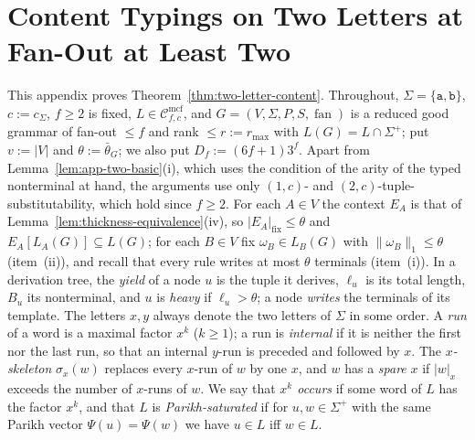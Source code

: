 \documentclass[11pt]{article}
\numberwithin{equation}{section}
\theoremstyle{plain}
\theoremstyle{definition}
\theoremstyle{remark}
\newcommand{\Cmcf}[2]{\mathcal{C}^{\mathrm{mcf}}_{#1,#2}}
\newcommand{\fan}{\operatorname{fan}}
\theoremstyle{plain}
\begin{document}
\section{Content Typings on Two Letters at Fan-Out at Least Two}
\label{app:two-letter-content}

This appendix proves Theorem~\ref{thm:two-letter-content}.  Throughout,
$\Sigma=\{\mathtt a,\mathtt b\}$, $c:=c_\Sigma$, $f\ge2$ is fixed, $L\in\Cmcf{f}{c}$, and
$G=(V,\Sigma,P,S,\fan)$ is a reduced good grammar of fan-out $\le f$ and rank
$\le r:=r_{\max}$ with $L(G)=L\cap\Sigma^+$; put $v:=|V|$ and
$\theta:=\bar\theta_G$; we also put $D_f:=(6f+1)3^f$.  Apart from Lemma~\ref{lem:app-two-basic}(i), which uses the
condition of the arity of the typed nonterminal at hand, the arguments use only
$(1,c)$- and $(2,c)$-tuple-substitutability, which hold since $f\ge2$.  For each $A\in V$ the context $E_A$ is that of
Lemma~\ref{lem:thickness-equivalence}(iv), so $|E_A|_{\mathrm{fix}}\le\theta$
and $E_A[L_A(G)]\subseteq L(G)$; for each $B\in V$ fix $\omega_B\in L_B(G)$ with
$\|\omega_B\|_1\le\theta$ (item~(ii)), and recall that every rule writes at most
$\theta$ terminals (item~(i)).  In a derivation tree, the \emph{yield} of a node
$u$ is the tuple it derives, $\ell_u$ is its total length, $B_u$ its
nonterminal, and $u$ is \emph{heavy} if $\ell_u>\theta$; a node \emph{writes}
the terminals of its template.  The letters $x,y$ always denote the two
letters of $\Sigma$ in some order.  A \emph{run} of a word is a maximal factor
$x^k$ ($k\ge1$); a run is \emph{internal} if it is neither the first nor the
last run, so that an internal $y$-run is preceded and followed by $x$.  The
\emph{$x$-skeleton} $\sigma_x(w)$ replaces every $x$-run of $w$ by one $x$, and
$w$ has a \emph{spare} $x$ if $|w|_x$ exceeds the number of $x$-runs of $w$.
We say that \emph{$x^k$ occurs} if some word of $L$ has the factor $x^k$, and
that $L$ is \emph{Parikh-saturated} if for $u,w\in\Sigma^+$ with the same
Parikh vector $\Psi(u)=\Psi(w)$ we have $u\in L$ iff $w\in L$.
\end{document}
